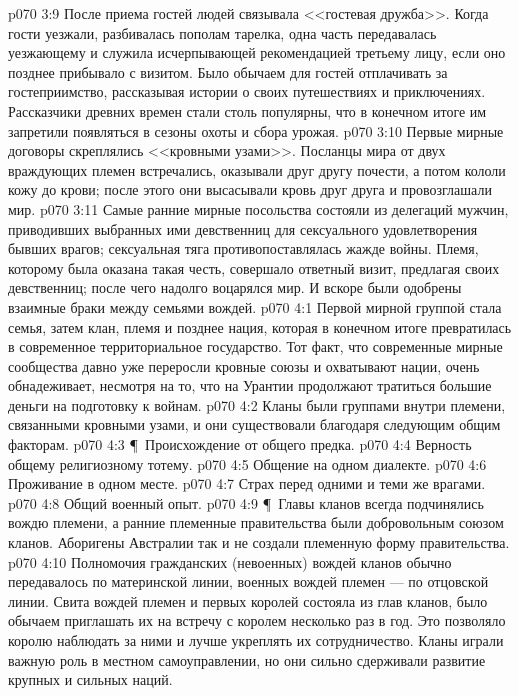 \vs p070 3:9 После приема гостей людей связывала <<гостевая дружба>>. Когда гости уезжали, разбивалась пополам тарелка, одна часть передавалась уезжающему и служила исчерпывающей рекомендацией третьему лицу, если оно позднее прибывало с визитом. Было обычаем для гостей отплачивать за гостеприимство, рассказывая истории о своих путешествиях и приключениях. Рассказчики древних времен стали столь популярны, что в конечном итоге им запретили появляться в сезоны охоты и сбора урожая.
\vs p070 3:10 Первые мирные договоры скреплялись <<кровными узами>>. Посланцы мира от двух враждующих племен встречались, оказывали друг другу почести, а потом кололи кожу до крови; после этого они высасывали кровь друг друга и провозглашали мир.
\vs p070 3:11 Самые ранние мирные посольства состояли из делегаций мужчин, приводивших выбранных ими девственниц для сексуального удовлетворения бывших врагов; сексуальная тяга противопоставлялась жажде войны. Племя, которому была оказана такая честь, совершало ответный визит, предлагая своих девственниц; после чего надолго воцарялся мир. И вскоре были одобрены взаимные браки между семьями вождей.
\vs p070 4:1 Первой мирной группой стала семья, затем клан, племя и позднее нация, которая в конечном итоге превратилась в современное территориальное государство. Тот факт, что современные мирные сообщества давно уже переросли кровные союзы и охватывают нации, очень обнадеживает, несмотря на то, что на Урантии продолжают тратиться большие деньги на подготовку к войнам.
\vs p070 4:2 Кланы были группами внутри племени, связанными кровными узами, и они существовали благодаря следующим общим факторам.
\vs p070 4:3 \P\ \bibnobreakspace Происхождение от общего предка.
\vs p070 4:4 \bibnobreakspace Верность общему религиозному тотему.
\vs p070 4:5 \bibnobreakspace Общение на одном диалекте.
\vs p070 4:6 \bibnobreakspace Проживание в одном месте.
\vs p070 4:7 \bibnobreakspace Страх перед одними и теми же врагами.
\vs p070 4:8 \bibnobreakspace Общий военный опыт.
\vs p070 4:9 \P\ Главы кланов всегда подчинялись вождю племени, а ранние племенные правительства были добровольным союзом кланов. Аборигены Австралии так и не создали племенную форму правительства.
\vs p070 4:10 Полномочия гражданских (невоенных) вождей кланов обычно передавалось по материнской линии, военных вождей племен --- по отцовской линии. Свита вождей племен и первых королей состояла из глав кланов, было обычаем приглашать их на встречу с королем несколько раз в год. Это позволяло королю наблюдать за ними и лучше укреплять их сотрудничество. Кланы играли важную роль в местном самоуправлении, но они сильно сдерживали развитие крупных и сильных наций.
